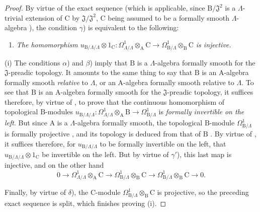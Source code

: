 \begin{proof}
By virtue of the exact sequence  (which is applicable, since $\mathrm{B}/\mathfrak{J}^2$ is a $\Lambda$-trivial extension of $\mathrm{C}$ by $\mathfrak{J}/\mathfrak{J}^2$, $\mathrm{C}$ being assumed to be a formally smooth $\Lambda$-algebra ), the condition $\gamma$) is equivalent to the following:
\begin{enumerate}
  \item[$\gamma'$)] \emph{The homomorphism $u_{\mathrm{B}/\Lambda/\Lambda}\otimes 1_\mathrm{C}:\Omega^1_{\Lambda/\Lambda}\otimes_\mathrm{A}\mathrm{C}\to\Omega^1_{\mathrm{B}/\Lambda}\otimes_\mathrm{B}\mathrm{C}$ is injective.}
\end{enumerate}

(i) The conditions $\alpha$) and $\beta$) imply that $\mathrm{B}$ is a $\Lambda$-algebra formally smooth for the $\mathfrak{J}$-preadic topology.
It amounts to the same thing to say that $\mathrm{B}$ is an $\mathrm{A}$-algebra formally smooth \emph{relative} to $\Lambda$, or an $\mathrm{A}$-algebra formally smooth relative to $\Lambda$.
To see that $\mathrm{B}$ is an $\mathrm{A}$-algebra formally smooth for the $\mathfrak{J}$-preadic topology, it suffices therefore, by virtue of , to prove that the continuous homomorphism of topological $\mathrm{B}$-modules $u_{\mathrm{B}/\Lambda/\Lambda}:\Omega^1_{\Lambda/\Lambda}\otimes_\mathrm{A}\mathrm{B}\to\Omega^1_{\mathrm{B}/\Lambda}$ is \emph{formally invertible on the left}.
But since $\mathrm{A}$ is a $\Lambda$-algebra formally smooth, the topological $\mathrm{B}$-module $\Omega^1_{\mathrm{B}/\Lambda}$ is formally projective , and its topology is deduced from that of $\mathrm{B}$ .
By virtue of , it suffices therefore, for $u_{\mathrm{B}/\Lambda/\Lambda}$ to be formally invertible on the left, that $u_{\mathrm{B}/\Lambda/\Lambda}\otimes 1_\mathrm{C}$ be invertible on the left.
But by virtue of $\gamma'$), this last map is injective, and on the other hand
\[
  0\to\Omega^1_{\Lambda/\Lambda}\otimes_\mathrm{A}\mathrm{C}\to\Omega^1_{\mathrm{B}/\Lambda}\otimes_\mathrm{B}\mathrm{C}\to\Omega^1_{\mathrm{B}/\Lambda}\otimes_\mathrm{B}\mathrm{C}\to 0.
\]

Finally, by virtue of $\delta$), the $\mathrm{C}$-module $\Omega^1_{\mathrm{B}/\Lambda}\otimes_\mathrm{B}\mathrm{C}$ is projective, so the preceding exact sequence is split, which finishes proving (i).


\end{proof}
